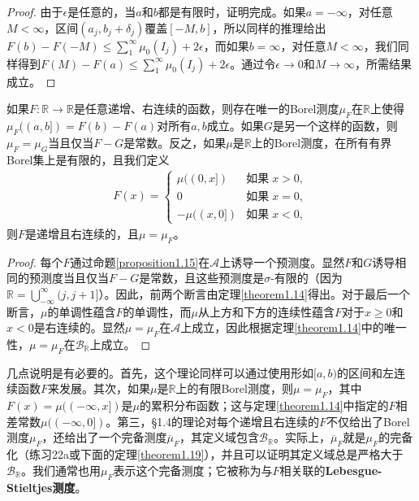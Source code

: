 \documentclass[lang=cn,10pt,thmcnt=section]{elegantbook}
\begin{document}
\begin{proof}
	由于$\epsilon$是任意的，当$a$和$b$都是有限时，证明完成。如果$a = -\infty$，对任意$M < \infty$，区间$(a_j, b_j + \delta_j)$覆盖$[-M, b]$，所以同样的推理给出$F(b) - F(-M) \leq \sum_{1}^{\infty} \mu_0(I_j) + 2\epsilon$，而如果$b = \infty$，对任意$M < \infty$，我们同样得到$F(M) - F(a) \leq \sum_{1}^{\infty} \mu_0(I_j) + 2\epsilon$。通过令$\epsilon \to 0$和$M \to \infty$，所需结果成立。
\end{proof}
\begin{theorem}\label{theorem1.16}
如果$F : \mathbb{R} \to \mathbb{R}$是任意递增、右连续的函数，则存在唯一的Borel测度$\mu_F$在$\mathbb{R}$上使得$\mu_F((a, b]) = F(b) - F(a)$对所有$a, b$成立。如果$G$是另一个这样的函数，则$\mu_F = \mu_G$当且仅当$F - G$是常数。反之，如果$\mu$是$\mathbb{R}$上的Borel测度，在所有有界Borel集上是有限的，且我们定义
\begin{align}
F(x) = 
\begin{cases}
\mu((0, x]) & \text{如果} \; x > 0, \\
0 & \text{如果} \; x = 0, \\
-\mu((x, 0]) & \text{如果} \; x < 0,
\end{cases}
\end{align}
则$F$是递增且右连续的，且$\mu = \mu_F$。
\end{theorem}

\begin{proof}
每个$F$通过命题\ref{proposition1.15}在$\mathcal{A}$上诱导一个预测度。显然$F$和$G$诱导相同的预测度当且仅当$F - G$是常数，且这些预测度是$\sigma$-有限的（因为$\mathbb{R} = \bigcup_{-\infty}^{\infty}(j, j+1]$）。因此，前两个断言由定理\ref{theorem1.14}得出。对于最后一个断言，$\mu$的单调性蕴含$F$的单调性，而$\mu$从上方和下方的连续性蕴含$F$对于$x \geq 0$和$x < 0$是右连续的。显然$\mu = \mu_F$在$\mathcal{A}$上成立，因此根据定理\ref{theorem1.14}中的唯一性，$\mu = \mu_F$在$\mathcal{B}_{\mathbb{R}}$上成立。
\end{proof}

几点说明是有必要的。首先，这个理论同样可以通过使用形如$[a, b)$的区间和左连续函数$F$来发展。其次，如果$\mu$是$\mathbb{R}$上的有限Borel测度，则$\mu = \mu_F$，其中$F(x) = \mu((-\infty, x])$是$\mu$的累积分布函数；这与定理\ref{theorem1.14}中指定的$F$相差常数$\mu((-\infty, 0])$。第三，§1.4的理论对每个递增且右连续的$F$不仅给出了Borel测度$\mu_F$，还给出了一个完备测度$\overline{\mu}_F$，其定义域包含$\mathcal{B}_{\mathbb{R}}$。实际上，$\overline{\mu}_F$就是$\mu_F$的完备化（练习22a或下面的定理\ref{theorem1.19}），并且可以证明其定义域总是严格大于$\mathcal{B}_{\mathbb{R}}$。我们通常也用$\mu_F$表示这个完备测度；它被称为与$F$相关联的\textbf{Lebesgue-Stieltjes测度}。
\end{document}
